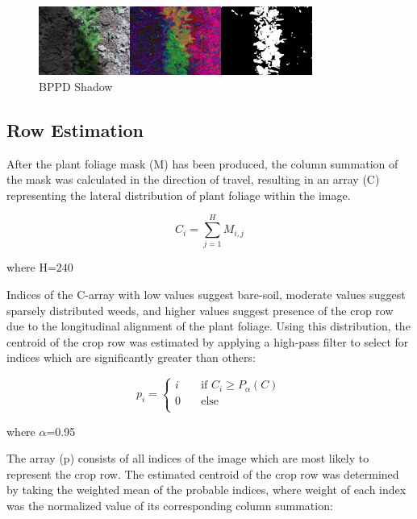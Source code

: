 \documentclass[authoryear]{elsarticle}
\begin{document}
\begin{figure}
  \centering
  \includegraphics[width=0.8\textwidth,natwidth=610,natheight=642]{bppd_shadow.jpg}
  \caption{BPPD Shadow}
  \label{fig:bppd_shadow}
\end{figure}

\subsection{Row Estimation}
After the plant foliage mask (M) has been produced, the column
summation of the mask was calculated in the direction of travel,
resulting in an array (C) representing the lateral distribution of
plant foliage within the image. 

\begin{equation}
  C_{i} = \displaystyle\sum_{j=1}^{H} M_{i,j}
  \label{eq:col_sum}
\end{equation}
\begin{flushleft}
where H=240
\end{flushleft}

Indices of the C-array with low values suggest bare-soil, moderate
values suggest sparsely distributed weeds, and higher values suggest
presence of the crop row due to the longitudinal alignment of the
plant foliage. Using this distribution, the centroid of the crop row
was estimated by applying a high-pass filter to select for indices
which are significantly greater than others: 

\begin{equation}
  p_{i} =
  \begin{cases}
    i & \quad \text{if } C_{i} \geq P_{\alpha}(C) \\
    0 & \quad \text{else} \\
  \end{cases}
  \label{eq:p_threshold}
\end{equation}
\begin{flushleft}
where $\alpha$=0.95
\end{flushleft}

The array (p) consists of all indices of the image which are most
likely to represent the crop row. The estimated centroid of the crop
row was determined by taking the weighted mean of the probable
indices, where weight of each index was the normalized value of its
corresponding column summation:
\end{document}

